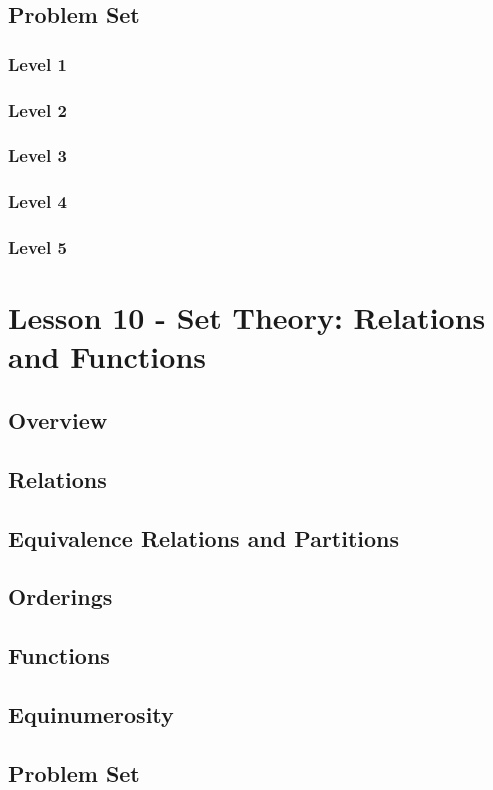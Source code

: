 \documentclass{article}
\begin{document}
\subsection{Problem Set}
\subsubsection{Level 1}
\subsubsection{Level 2}
\subsubsection{Level 3}
\subsubsection{Level 4}
\subsubsection{Level 5}
\pagebreak

\section{Lesson 10 - Set Theory: Relations and Functions}
\subsection{Overview}
\subsection{Relations}
\subsection{Equivalence Relations and Partitions}
\subsection{Orderings}
\subsection{Functions}
\subsection{Equinumerosity}
\subsection{Problem Set}
\end{document}
